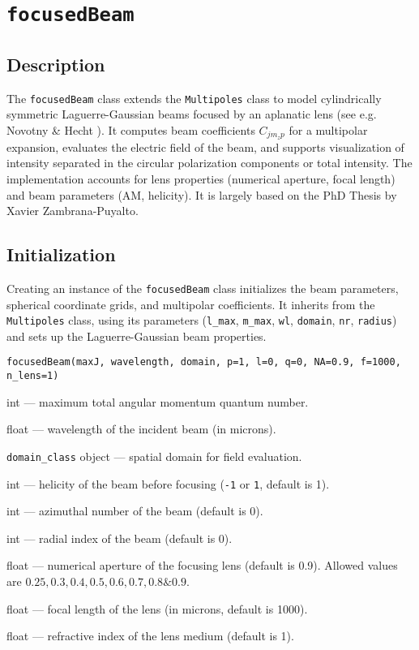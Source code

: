 \section{\texttt{focusedBeam}}

\subsection{Description}
The \texttt{focusedBeam} class extends the \texttt{Multipoles} class to model cylindrically symmetric Laguerre-Gaussian beams focused by an aplanatic lens (see e.g. Novotny \& Hecht \cite{nanooptics}). It computes beam coefficients \( C_{j m_z p} \) for a multipolar expansion, evaluates the electric field of the beam, and supports visualization of intensity separated in the circular polarization components or total intensity. The implementation accounts for lens properties (numerical aperture, focal length) and beam parameters (AM, helicity). It is largely based on the PhD Thesis by Xavier Zambrana-Puyalto\cite{xavi}.

\subsection{Initialization}
Creating an instance of the \texttt{focusedBeam} class initializes the beam parameters, spherical coordinate grids, and multipolar coefficients. It inherits from the \texttt{Multipoles} class, using its parameters (\texttt{l\_max}, \texttt{m\_max}, \texttt{wl}, \texttt{domain}, \texttt{nr}, \texttt{radius}) and sets up the Laguerre-Gaussian beam properties.

\begin{verbatim}
focusedBeam(maxJ, wavelength, domain, p=1, l=0, q=0, NA=0.9, f=1000, n_lens=1)
\end{verbatim}

\begin{description}[leftmargin=3cm]
    \item[\texttt{maxJ:}] int — maximum total angular momentum quantum number.
    \item[\texttt{wavelength:}] float — wavelength of the incident beam (in microns).
    \item[\texttt{domain:}] \texttt{domain\_class} object — spatial domain for field evaluation.
    \item[\texttt{p:}] int — helicity of the beam before focusing (\texttt{-1} or \texttt{1}, default is 1).
    \item[\texttt{l:}] int — azimuthal number of the beam (default is 0).
    \item[\texttt{q:}] int — radial index of the beam (default is 0).
    \item[\texttt{NA:}] float — numerical aperture of the focusing lens (default is 0.9). Allowed values are $0.25, 0.3, 0.4, 0.5, 0.6, 0.7, 0.8 \& 0.9$.
    \item[\texttt{f:}] float — focal length of the lens (in microns, default is 1000).
    \item[\texttt{n\_lens:}] float — refractive index of the lens medium (default is 1).
\end{description}

